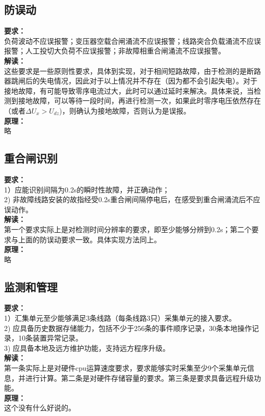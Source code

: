 \documentclass{article}
\begin{document}
\begin{CJK}{UTF8}{gbsn}
\subsection{ 防误动}
	\par
	\textbf{要求：}\\
	负荷波动不应误报警；变压器空载合闸涌流不应误报警；线路突合负载涌流不应误报警；人工投切大负荷不应误报警；非故障相重合闸涌流不应误报警。\\
	\textbf{解读：}\\
	这些要求是一些原则性要求，具体到实现，对于相间短路故障，由于检测的是断路器跳闸后的失电情况，因此对于以上情况并不存在（因为都不会引起失电）。对于接地故障，有可能导致零序电流过大，此时可以通过延时来解决。具体来说，当检测到接地故障，可以等待一段时间，再进行检测一次，如果此时零序电压依然存在（或者$\Delta U_x>U_{dz}$)，则确认为接地故障，否则认为是误报。\\
	\textbf{原理：}\\
	略
\subsection{ 重合闸识别}
	\par
	\textbf{要求：}\\
	1）应能识别间隔为0.2s的瞬时性故障，并正确动作；\\
	2) 非故障线路安装的故指经受0.2s重合闸间隔停电后，在感受到重合闸涌流后不应误动作。\\
	\textbf{解读：}\\
	第一个要求实际上是对检测时间分辨率的要求，即至少能够分辨到0.2s；第二个要求与上面的防误动要求一致。具体实现方法同上。\\
	\textbf{原理：}\\
	略
\subsection{ 监测和管理}
	\par
	\textbf{要求：}\\
	1）汇集单元至少能够满足3条线路（每条线路3只）采集单元的接入要求。\\
	2) 应具备历史数据存储能力，包括不少于256条的事件顺序记录，30条本地操作记录，10条装置异常记录。\\
	3) 应具备本地及远方维护功能，支持远方程序升级。\\
	\textbf{解读：}\\
	第一条实际上是对硬件cpu运算速度要求，要求能够实时采集至少9个采集单元信息，并进行计算。第二条是对硬件存储容量的要求。第三条是要求具备远程升级功能。\\
	\textbf{原理：}\\
	这个没有什么好说的。

\end{CJK}
\end{document}
